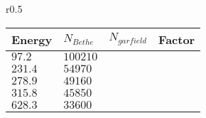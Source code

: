 \begin{wraptable}{r}{0.5\textwidth}
	\centering
	\caption[]
	{}
	\label{chap3:GarfieldBethe}
	\begin{tabular}{llll}
		\toprule
		Energy    & \(N_{Bethe}\) & \(N_{garfield}\) & Factor \\
		\midrule
		\(97.2\)  & \(100210\)    & \(\)             & \(\)   \\
		\(231.4\) & \(54970\)     & \(\)             & \(\)   \\
		\(278.9\) & \(49160\)     & \(\)             & \(\)   \\
		\(315.8\) & \(45850\)     & \(\)             & \(\)   \\
		\(628.3\) & \(33600\)     & \(\)             & \(\)   \\
		\bottomrule
	\end{tabular}
\end{wraptable}